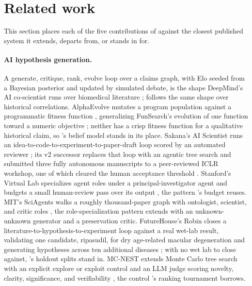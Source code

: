 \documentclass[11pt]{article}
\begin{document}
\section{Related work}
\label{sec:related}

This section places each of the five contributions of 
against the closest published system it extends, departs from, or
stands in for.

\paragraph{AI hypothesis generation.} A generate, critique, rank, evolve
loop over a claims graph, with Elo seeded from a Bayesian posterior and
updated by simulated debate, is the shape DeepMind's AI co-scientist runs
over biomedical literature \autocite{gottweis2025coscientist};
 follows the same shape over historical correlations.
AlphaEvolve mutates a program population against a programmatic fitness
function \autocite{novikov2025alphaevolve}, generalizing FunSearch's
evolution of one function toward a numeric objective
\autocite{romeraparedes2024funsearch}; neither has a crisp fitness
function for a qualitative historical claim, so 's
belief model stands in its place. Sakana's AI Scientist runs an
idea-to-code-to-experiment-to-paper-draft loop scored by an automated
reviewer \autocite{lu2024aiscientist}; its v2 successor replaces that
loop with an agentic tree search and submitted three fully autonomous
manuscripts to a peer-reviewed ICLR workshop, one of which cleared the
human acceptance threshold \autocite{yamada2025aiscientistv2}. Stanford's
Virtual Lab specializes agent roles under a principal-investigator agent
and budgets a small human-review pass over its output
\autocite{swanson2024virtuallab}, the pattern 's
 budget reuses. MIT's SciAgents
walks a roughly thousand-paper graph with ontologist, scientist, and
critic roles \autocite{ghafarollahi2024sciagents}, the role-specialization
pattern  extends with an unknown-unknown generator
and a preservation critic. FutureHouse's Robin closes a
literature-to-hypothesis-to-experiment loop against a real wet-lab
result, validating one candidate, ripasudil, for dry age-related macular
degeneration and generating hypotheses across ten additional diseases
\autocite{ghareeb2025robin}; with no wet lab to close against,
's holdout splits stand in. MC-NEST extends Monte
Carlo tree search with an explicit explore or exploit control and an LLM
judge scoring novelty, clarity, significance, and verifiability
\autocite{rabby2024mcnest}, the control 's ranking
tournament borrows.
\end{document}
